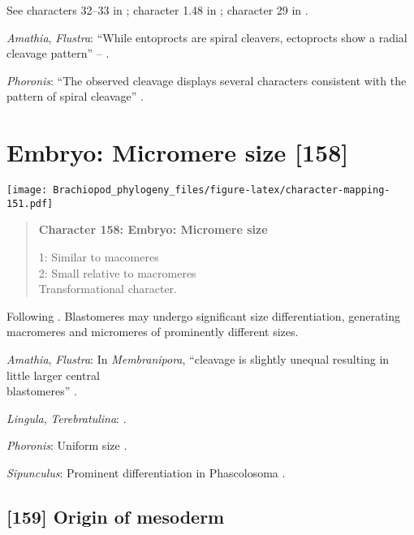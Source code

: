 \documentclass[openany]{book}
\theoremstyle{definition}
\theoremstyle{definition}
\theoremstyle{definition}
\theoremstyle{remark}
\begin{document}
See characters 32--33 in \citet{Haszprunar1996}; character 1.48 in
\citet{SPS1996}; character 29 in \citet{Glenner2004}.

\hypertarget{Amathia-coding-157}{}
\emph{Amathia}, \emph{Flustra}: ``While entoprocts are spiral cleavers,
ectoprocts show a radial cleavage pattern'' -- \citet{Fuchs2008}.

\hypertarget{Phoronis-coding-157}{}
\emph{Phoronis}: ``The observed cleavage displays several characters
consistent with the pattern of spiral cleavage''
\citep{Pennerstorfer2012}.

\section{Embryo: Micromere size
{[}158{]}}\label{embryo-micromere-size-158}

\texttt{[image: Brachiopod\_phylogeny\_files/figure-latex/character-mapping-151.pdf]}

\begin{quote}
\textbf{Character 158: Embryo: Micromere size}

1: Similar to macomeres\\
2: Small relative to macromeres\\
Transformational character.
\end{quote}

Following \citet{Hejnol2010}. Blastomeres may undergo significant size
differentiation, generating macromeres and micromeres of prominently
different sizes.

\hypertarget{Amathia-coding-158}{}
\emph{Amathia}, \emph{Flustra}: In \emph{Membranipora}, ``cleavage is
slightly unequal resulting in little larger central\\
blastomeres'' \citep{Gruhl2010M}.

\hypertarget{Lingula-coding-158}{}
\emph{Lingula}, \emph{Terebratulina}: \citet{Williams1997Introduction}.

\hypertarget{Phoronis-coding-158}{}
\emph{Phoronis}: Uniform size \citep{Pennerstorfer2012}.

\hypertarget{Sipunculus-coding-158}{}
\emph{Sipunculus}: Prominent differentiation in Phascolosoma
\citep{Adrianov2011}.

\subsection*{{[}159{]} Origin of mesoderm}\label{origin-of-mesoderm}
\end{document}
